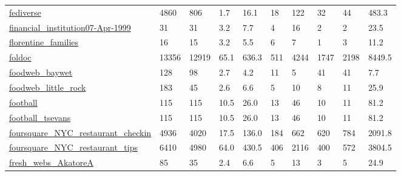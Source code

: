 \begin{longtable}{llllllllll}
 \href{https://gist.github.com/Gargron/48e67b1b14723cd178c951fe7f373a38}{fediverse}                                         & 4860       & 806   & 1.7    & 16.1   & 18    & 122    & 32     & 44     & 483.3   \\
 \href{https://doi.org/10.5061/dryad.5b8n621}{financial\_institution07-Apr-1999}                                             & 31         & 31    & 3.2    & 7.7    & 4     & 16     & 2      & 2      & 23.5    \\
 \href{https://comunelab.fbk.eu/data.php}{florentine\_families}                                                              & 16         & 15    & 3.2    & 5.5    & 6     & 7      & 1      & 3      & 11.2    \\
 \href{http://konect.cc/networks/foldoc}{foldoc}                                                                            & 13356      & 12919 & 65.1   & 636.3  & 511   & 4244   & 1747   & 2198   & 8449.5  \\
 \href{http://konect.cc/networks/foodweb-baywet}{foodweb\_baywet}                                                            & 128        & 98    & 2.7    & 4.2    & 11    & 5      & 41     & 41     & 7.7     \\
 \href{http://konect.cc/networks/maayan-foodweb}{foodweb\_little\_rock}                                                       & 183        & 45    & 2.6    & 6.6    & 5     & 10     & 8      & 11     & 25.9    \\
 \href{http://www-personal.umich.edu/~mejn/netdata}{football}                                                               & 115        & 115   & 10.5   & 26.0   & 13    & 46     & 10     & 11     & 81.2    \\
 \href{https://figshare.com/articles/American_College_Football_Network_Files/93179}{football\_tsevans}                       & 115        & 115   & 10.5   & 26.0   & 13    & 46     & 10     & 11     & 81.2    \\
 \href{https://sites.google.com/site/yangdingqi/home/foursquare-dataset}{foursquare\_NYC\_restaurant\_checkin}                 & 4936       & 4020  & 17.5   & 136.0  & 184   & 662    & 620    & 784    & 2091.8  \\
 \href{https://sites.google.com/site/yangdingqi/home/foursquare-dataset}{foursquare\_NYC\_restaurant\_tips}                    & 6410       & 4980  & 64.0   & 430.5  & 406   & 2116   & 400    & 572    & 3804.5  \\
 \href{https://iwdb.nceas.ucsb.edu/html/thomps_towns.html}{fresh\_webs\_AkatoreA}                                             & 85         & 35    & 2.4    & 6.6    & 5     & 13     & 3      & 5      & 24.9    \\

\end{longtable}
